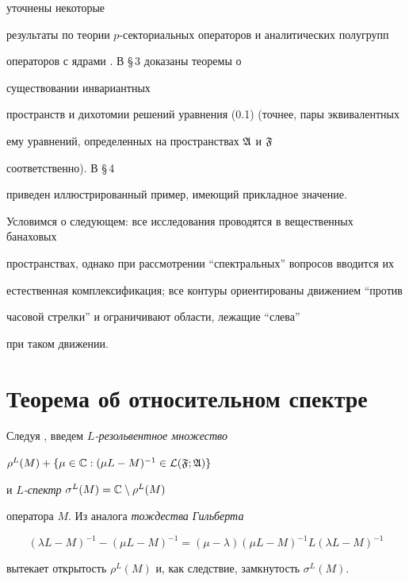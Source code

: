 уточнены некоторые 


результаты по теории $p$-секториальных операторов и аналитических полугрупп 


операторов с ядрами \cite{Sv5}. В \S\,3 доказаны теоремы о 


существовании инвариантных 


пространств и дихотомии решений уравнения (0.1) (точнее, пары эквивалентных 


ему уравнений, определенных на пространствах $\frak A$ и $\frak F$ 


соответственно). В \S\,4 


приведен иллюстрированный пример, имеющий прикладное значение. 


 


Условимся о следующем: все исследования проводятся в вещественных банаховых 


пространствах, однако при рассмотрении ``спектральных'' вопросов вводится их 


естественная комплексификация; все контуры ориентированы движением ``против 


часовой стрелки'' и ограничивают области, лежащие ``слева'' 


при таком движении. 


 


\section{Теорема об относительном спектре} 


 


Следуя \cite{Sv5}, введем $L${\it-резольвентное множество} 


$\rho^L(M)+\{\mu\in\Bbb C:(\mu L-M)^{-1}\in\cal L(\frak F;\frak A)\}$ 


и $L${\it -спектр} $\sigma^L(M)=\Bbb C\setminus\rho^L(M)$ 


оператора $M$. Из аналога {\it тождества Гильберта} \cite{Sv5} 


\begin{equation} 


(\lambda L-M)^{-1}-(\mu L-M)^{-1}= 


(\mu-\lambda)(\mu L-M)^{-1}L(\lambda L-M)^{-1} 


\end{equation} 


вытекает открытость $\rho^L(M)$ и, как следствие, замкнутость $\sigma^L(M)$. 



